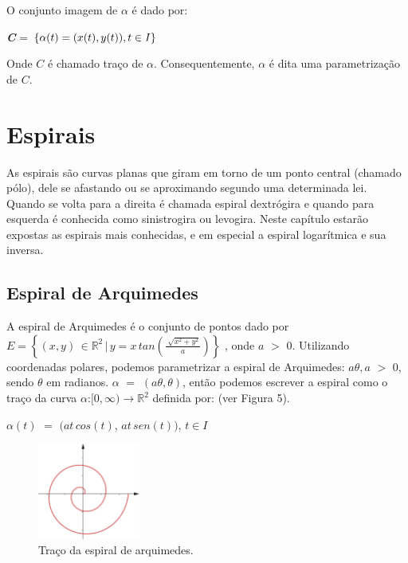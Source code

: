\documentclass[twoside,a4paper,10pt]{article}
\newcommand{\R}{\mathbb R} %
\begin{document}
O conjunto imagem de $\alpha$ é dado por:

\begin{center}
	{\bf\it C} = $\left\{\alpha(t) = (x(t), y(t)), t\in {\bf\it I} \right\}$
\end{center} 
	
Onde $C$ é chamado traço de $\alpha$. Consequentemente, $\alpha$ é dita uma parametrização de $C$. \section{Espirais}
	
As espirais são curvas planas que giram em torno de um ponto central (chamado pólo), dele se afastando ou se aproximando segundo uma determinada lei. Quando se volta para a direita é chamada espiral dextrógira e quando para esquerda é conhecida como sinistrogira ou levogira. Neste capítulo estarão expostas as espirais mais conhecidas, e em especial a espiral logarítmica e sua inversa.

\subsection{Espiral de Arquimedes}

A espiral de Arquimedes é o conjunto de pontos dado por $E = \left\{(x, y)\, \in \R^{2} \,|\, y = x\,tan\left(\frac{\sqrt[]{x^2 + y^2}}{a}\right)\right\}$ , onde $a$ $>$ $0$. Utilizando coordenadas polares, podemos parametrizar a espiral de Arquimedes: $a\theta, a$ $>$ $0$, sendo $\theta$ em radianos. $\alpha$ $=$ $(a\theta, \theta)$, então podemos escrever a espiral como o traço da curva $\alpha$:$[0, \infty) \rightarrow \R^2$ definida por: (ver Figura 5).

\begin{center}
	$\alpha(t)$ $=$ $(at\,cos(t)$, $at\,sen(t))$, $t\in I$
\end{center}

\begin{figure}[h!]
	\centering
	\includegraphics[width=0.3\textwidth]{archim}
	\caption{Traço da espiral de arquimedes.}
\end{figure}
\end{document}
